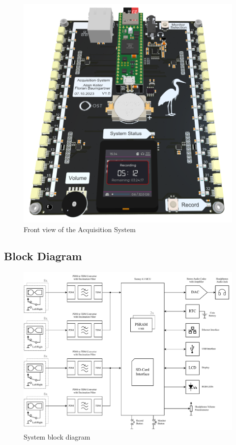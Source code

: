 \begin{figure}[h]
	\centering
	\includegraphics[width=1.0\textwidth]{images/4_design_acquisition_system/Acquisition_System_Front.png}
	\caption{Front view of the Acquisition System}
	\label{fig:acquisition_system_front}
\end{figure}


\subsection{Block Diagram}

\begin{figure}[h]
	\centering
	\includegraphics[width=1.0\textwidth]{images/4_design_acquisition_system/system_block_diagram.pdf}
	\caption{System block diagram}
	\label{fig:system_block_diagram}
\end{figure}

